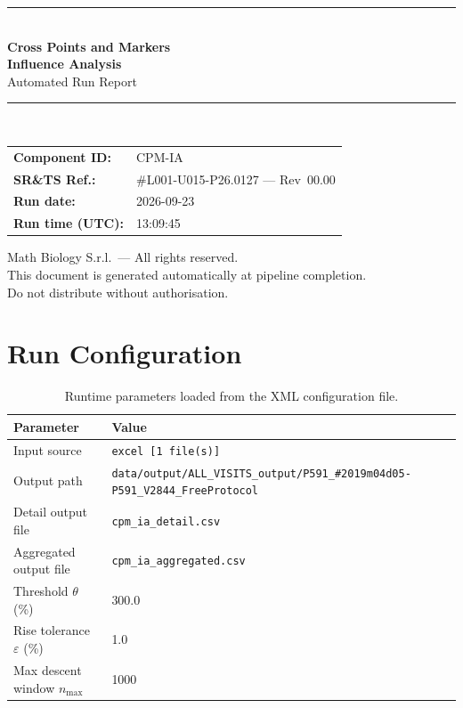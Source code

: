 \documentclass[a4paper,11pt]{article}
\begin{document}
\begin{titlepage}
\begin{center}
  \vspace*{1.8cm}
  {\color{dmaaccent}\rule{\linewidth}{1.5pt}}\\[0.6cm]
  {\LARGE\bfseries\color{dmaaccent}
    Cross Points and Markers\\[0.25cm]
    Influence Analysis}\\[0.4cm]
  {\Large Automated Run Report}\\[0.3cm]
  {\color{dmaaccent}\rule{\linewidth}{1.5pt}}\\[2cm]

  \begin{tabular}{ll}
    \textbf{Component ID:}   & CPM-IA \\[0.3cm]
    \textbf{SR\&TS Ref.:}    & \#L001-U015-P26.0127 --- Rev~00.00 \\[0.3cm]
    \textbf{Run date:}       & 2026-09-23 \\[0.3cm]
    \textbf{Run time (UTC):} & 13:09:45 \\
  \end{tabular}

  \vfill
  {\color{dmagray}\small
    Math Biology S.r.l.\ --- All rights reserved.\\
    This document is generated automatically at pipeline completion.\\
    Do not distribute without authorisation.}
\end{center}
\end{titlepage}

\tableofcontents
\clearpage

\section{Run Configuration}

\begin{table}[h!]
\centering
\small
\caption{Runtime parameters loaded from the XML configuration file.}
\begin{tabular}{ll}
\toprule
\textbf{Parameter} & \textbf{Value} \\
\midrule
Input source                      & \texttt{excel [1 file(s)]} \\
Output path                       & \texttt{data/output/ALL\_VISITS\_output/P591\_\#2019m04d05-P591\_V2844\_FreeProtocol} \\
Detail output file                & \texttt{cpm\_ia\_detail.csv} \\
Aggregated output file            & \texttt{cpm\_ia\_aggregated.csv} \\
Threshold $\theta$ (\%)           & 300.0 \\
Rise tolerance $\varepsilon$ (\%) & 1.0 \\
Max descent window $n_{\max}$     & 1000 \\
\bottomrule
\end{tabular}
\end{table}
\end{document}
